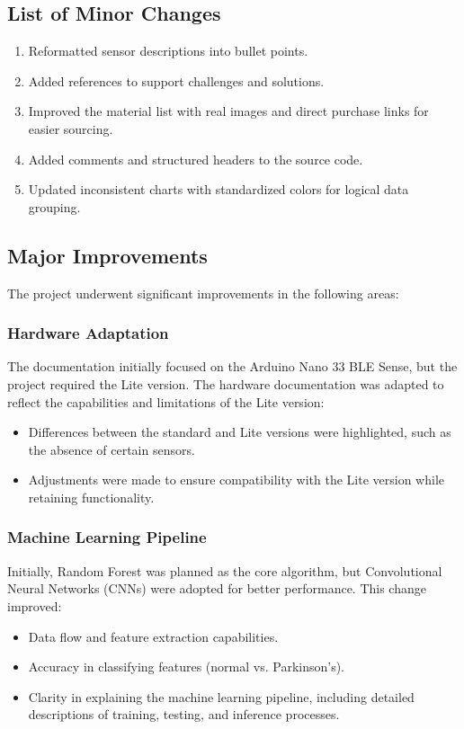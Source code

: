 \subsection{List of Minor Changes}
\begin{enumerate}
	\item Reformatted sensor descriptions into bullet points.
	\item Added references to support challenges and solutions.
	\item Improved the material list with real images and direct purchase links for easier sourcing.
	\item Added comments and structured headers to the source code.
	\item Updated inconsistent charts with standardized colors for logical data grouping.
\end{enumerate}

\subsection{Major Improvements}
The project underwent significant improvements in the following areas:

\subsubsection{Hardware Adaptation}
The documentation initially focused on the Arduino Nano 33 BLE Sense, but the project required the Lite version. The hardware documentation was adapted to reflect the capabilities and limitations of the Lite version:
\begin{itemize}
	\item Differences between the standard and Lite versions were highlighted, such as the absence of certain sensors.
	\item Adjustments were made to ensure compatibility with the Lite version while retaining functionality.
\end{itemize}

\subsubsection{Machine Learning Pipeline}
Initially, Random Forest was planned as the core algorithm, but Convolutional Neural Networks (CNNs) were adopted for better performance. This change improved:
\begin{itemize}
	\item Data flow and feature extraction capabilities.
	\item Accuracy in classifying features (normal vs. Parkinson’s).
	\item Clarity in explaining the machine learning pipeline, including detailed descriptions of training, testing, and inference processes.
\end{itemize}

